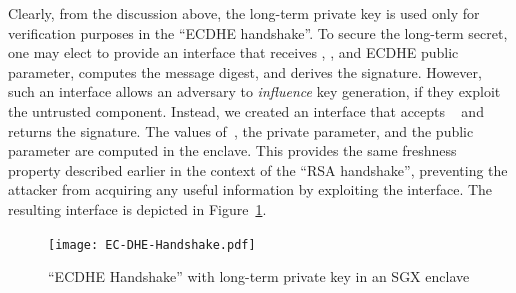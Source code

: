 \documentclass[../../main.tex]{subfiles}
\begin{document}
Clearly, from the discussion above, the long-term private key is used
only for verification purposes in the ``ECDHE handshake''. To secure
the long-term secret, one may elect to provide an interface that
receives \crandom, \srandom, and ECDHE public parameter, computes the
message digest, and derives the signature. However, such an interface
allows an adversary to \textit{influence} key generation, if they
exploit the untrusted component. Instead, we created an interface that
accepts \crandom~ and returns the signature. The values of~\srandom,
the private parameter, and the public parameter are computed in the
enclave. This provides the same freshness property described earlier
in the context of the ``RSA handshake'', preventing the attacker from
acquiring any useful information by exploiting the interface. The
resulting interface is depicted in Figure~\ref{fig:ecdhe-handshake}.

\begin{figure}[H]
  \centering
  \texttt{[image: EC-DHE-Handshake.pdf]}
  \caption{``ECDHE Handshake'' with long-term private key in an SGX
    enclave}
  \label{fig:ecdhe-handshake}
\end{figure}
\end{document}
